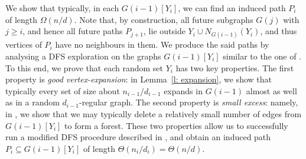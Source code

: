 \documentclass[reqno,a4paper]{amsart}
\theoremstyle{definition}
\newcommand{\eps}{\varepsilon}
\newcommand{\e}{\mathrm{e}}
\newcommand{\ex}{\mathrm{ex}}
\newcommand{\lyuc}[1]{{\color{blue}{ [~Lyuben:\ }\emph{#1}\textbf{~]}}}
\begin{document}
We show that typically, in each $G(i-1)[Y_i]$, we can find an induced path $P_i$ of length $\Omega(n/d)$.
Note that, by construction, 
all future subgraphs $G(j)$ with $j\ge i$, and hence all future paths $P_{j+1}$, lie outside $Y_i\cup N_{G(i-1)}(Y_i)$, and thus vertices of $P_i$ have no neighbours in them.
We produce the said paths by analysing a DFS exploration on the graphs $G(i-1)[Y_i]$ similar to the one of \cite{DKMZ25}.
To this end, we prove that each random set $Y_i$ has two key properties. 
The first property is \emph{good vertex-expansion}: in Lemma~\ref{l: expansion}, we show that typically every set of size about $n_{i-1}/d_{i-1}$ expands in $G(i-1)$ almost as well as in a random $d_{i-1}$-regular graph. 
The second property is \emph{small excess}: namely, in , we show that we may typically delete a relatively small number of edges from $G(i-1)[Y_i]$ to form a forest. %
These two properties allow us to successfully run a modified DFS procedure described in , and obtain an induced path $P_i\subseteq G(i-1)[Y_i]$ of length $\Theta(n_i/d_i)=\Theta(n/d)$.
\end{document}
